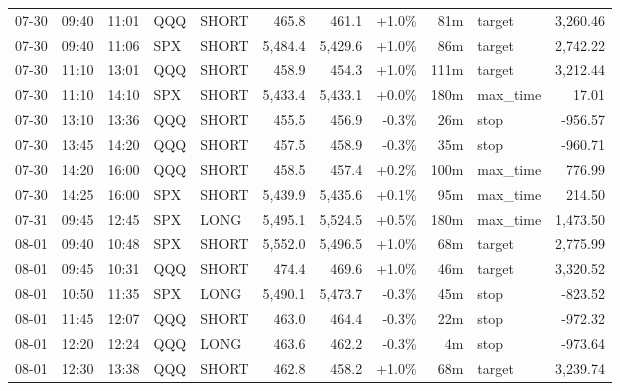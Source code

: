 \documentclass[11pt,a4paper,twoside]{article}
\begin{document}
\begin{center}
\begin{longtable}{>{\color{txtmain}}l l l l l r r r r >{\color{txtmain}}l r}
07-30 & 09:40 & 11:01 & QQQ & SHORT & 465.8 & 461.1 & \textcolor{wingreen}{+1.0\%} & 81m & target & \textcolor{wingreen}{3,260.46} \\
07-30 & 09:40 & 11:06 & SPX & SHORT & 5,484.4 & 5,429.6 & \textcolor{wingreen}{+1.0\%} & 86m & target & \textcolor{wingreen}{2,742.22} \\
07-30 & 11:10 & 13:01 & QQQ & SHORT & 458.9 & 454.3 & \textcolor{wingreen}{+1.0\%} & 111m & target & \textcolor{wingreen}{3,212.44} \\
07-30 & 11:10 & 14:10 & SPX & SHORT & 5,433.4 & 5,433.1 & \textcolor{wingreen}{+0.0\%} & 180m & max\_time & \textcolor{wingreen}{17.01} \\
07-30 & 13:10 & 13:36 & QQQ & SHORT & 455.5 & 456.9 & \textcolor{lossred}{-0.3\%} & 26m & stop & \textcolor{lossred}{-956.57} \\
07-30 & 13:45 & 14:20 & QQQ & SHORT & 457.5 & 458.9 & \textcolor{lossred}{-0.3\%} & 35m & stop & \textcolor{lossred}{-960.71} \\
07-30 & 14:20 & 16:00 & QQQ & SHORT & 458.5 & 457.4 & \textcolor{wingreen}{+0.2\%} & 100m & max\_time & \textcolor{wingreen}{776.99} \\
07-30 & 14:25 & 16:00 & SPX & SHORT & 5,439.9 & 5,435.6 & \textcolor{wingreen}{+0.1\%} & 95m & max\_time & \textcolor{wingreen}{214.50} \\
07-31 & 09:45 & 12:45 & SPX & LONG & 5,495.1 & 5,524.5 & \textcolor{wingreen}{+0.5\%} & 180m & max\_time & \textcolor{wingreen}{1,473.50} \\
08-01 & 09:40 & 10:48 & SPX & SHORT & 5,552.0 & 5,496.5 & \textcolor{wingreen}{+1.0\%} & 68m & target & \textcolor{wingreen}{2,775.99} \\
08-01 & 09:45 & 10:31 & QQQ & SHORT & 474.4 & 469.6 & \textcolor{wingreen}{+1.0\%} & 46m & target & \textcolor{wingreen}{3,320.52} \\
08-01 & 10:50 & 11:35 & SPX & LONG & 5,490.1 & 5,473.7 & \textcolor{lossred}{-0.3\%} & 45m & stop & \textcolor{lossred}{-823.52} \\
08-01 & 11:45 & 12:07 & QQQ & SHORT & 463.0 & 464.4 & \textcolor{lossred}{-0.3\%} & 22m & stop & \textcolor{lossred}{-972.32} \\
08-01 & 12:20 & 12:24 & QQQ & LONG & 463.6 & 462.2 & \textcolor{lossred}{-0.3\%} & 4m & stop & \textcolor{lossred}{-973.64} \\
08-01 & 12:30 & 13:38 & QQQ & SHORT & 462.8 & 458.2 & \textcolor{wingreen}{+1.0\%} & 68m & target & \textcolor{wingreen}{3,239.74} \\

\end{longtable}
\end{center}
\end{document}
